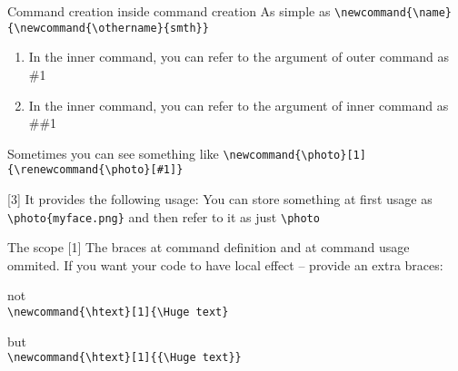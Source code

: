 

\begin{frame}[fragile]{Command creation inside command creation}\relax
As simple as \verb|\newcommand{\name}{\newcommand{\othername}{smth}}|

\begin{enumerate}
    \item In the inner command, you can refer to the argument of outer command as \#1
    \item In the inner command, you can refer to the argument of inner command as \#\#1
\end{enumerate}
\incPause
Sometimes you can see something like
\lstinline[basicstyle=\tt\small]|\newcommand{\photo}[1]{\renewcommand{\photo}[#1]}|

[3] It provides the following usage: You can store something at first usage as \verb|\photo{myface.png}| and then refer to it as just \verb|\photo|
\end{frame}

\begin{frame}[fragile]{The scope}\relax
     \cprotect{}[1]
     The braces at command definition and at command usage ommited. If you want your code to have local effect -- provide an extra braces:
     
     not \\  \lstinline[basicstyle=\tt]|\newcommand{\htext}[1]{\Huge text}|
     
     but \\  \lstinline[basicstyle=\tt]|\newcommand{\htext}[1]{{\Huge text}}|
\end{frame}

